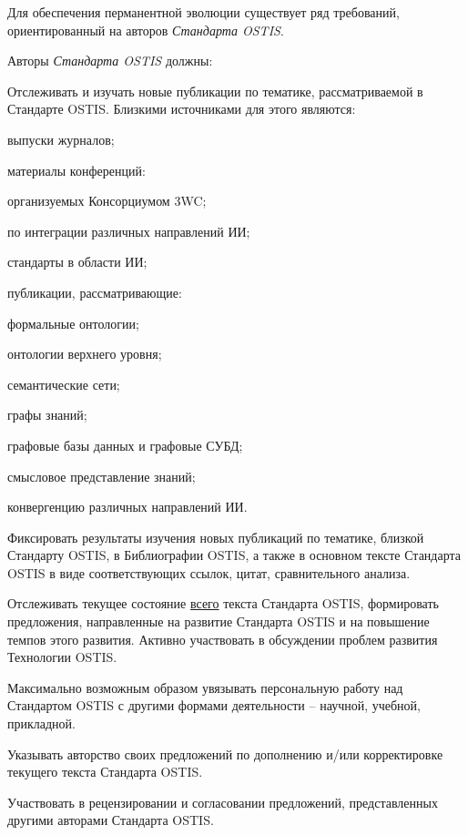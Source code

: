 Для обеспечения перманентной эволюции существует ряд требований, ориентированный на авторов \textit{Стандарта OSTIS}. 

Авторы \textit{Стандарта OSTIS} должны:

\begin{textitemize}
	\item Отслеживать и изучать новые публикации по тематике, рассматриваемой в Стандарте OSTIS. Близкими источниками для этого являются:
	\begin{textitemize}
		\item выпуски журналов;
		\item материалы конференций:
		\begin{textitemize}
			\item организуемых Консорциумом 3WC;
			\item по интеграции различных направлений ИИ;
		\end{textitemize}
		\item стандарты в области ИИ;
		\item публикации, рассматривающие:
		\begin{textitemize}
			\item формальные онтологии;
			\item онтологии верхнего уровня;
			\item семантические сети;
			\item графы знаний;
			\item графовые базы данных и графовые СУБД;
			\item смысловое представление знаний;
			\item конвергенцию различных направлений ИИ.
		\end{textitemize}
	\end{textitemize}
	\item Фиксировать результаты изучения новых публикаций по тематике, близкой Стандарту OSTIS, в Библиографии OSTIS, а также в основном тексте Стандарта OSTIS в виде соответствующих ссылок, цитат, сравнительного анализа. 
	\item Отслеживать текущее состояние \uline{всего} текста Стандарта OSTIS, формировать предложения, направленные на развитие Стандарта OSTIS и на повышение темпов этого развития. Активно участвовать в обсуждении проблем развития Технологии OSTIS.
	\item Максимально возможным образом увязывать персональную работу над Стандартом OSTIS с другими формами деятельности -- научной, учебной, прикладной.
	\item Указывать авторство своих предложений по дополнению и/или корректировке текущего текста Стандарта OSTIS.
	\item Участвовать в рецензировании и согласовании предложений, представленных другими авторами Стандарта OSTIS.
\end{textitemize}


